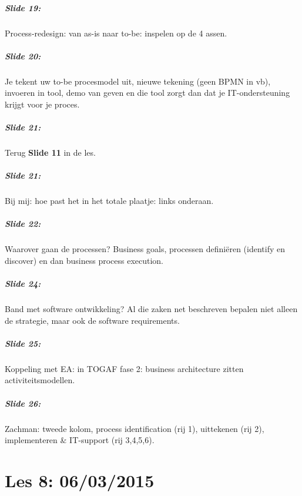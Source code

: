 \documentclass[10pt,a4paper]{report}
\begin{document}
\paragraph{Slide 19:}Process-redesign: van as-is naar to-be: inspelen op de 4 assen.

\paragraph{Slide 20:}Je tekent uw to-be procesmodel uit, nieuwe tekening (geen BPMN in vb), invoeren in tool, demo van geven en die tool zorgt dan dat je IT-ondersteuning krijgt voor je proces.

\paragraph{Slide 21:}Terug \textbf{Slide 11} in de les.

\paragraph{Slide 21:}Bij mij: hoe past het in het totale plaatje: links onderaan.

\paragraph{Slide 22:}Waarover gaan de processen? Business goals, processen definiëren (identify en discover) en dan business process execution.

\paragraph{Slide 24:}Band met software ontwikkeling? Al die zaken net beschreven bepalen niet alleen de strategie, maar ook de software requirements. 

\paragraph{Slide 25:}Koppeling met EA: in TOGAF fase 2: business architecture zitten activiteitsmodellen.

\paragraph{Slide 26:}Zachman: tweede kolom, process identification (rij 1), uittekenen (rij 2), implementeren \& IT-support (rij 3,4,5,6).

\chapter{Les 8: 06/03/2015}
\end{document}
